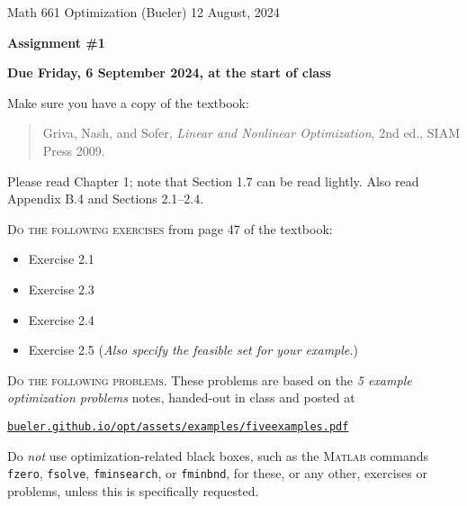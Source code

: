 \documentclass[12pt]{amsart}
\newcommand{\Matlab}{\textsc{Matlab}\xspace}
\begin{document}
\scriptsize \noindent Math 661 Optimization (Bueler) \hfill 12 August, 2024
\normalsize

\medskip\bigskip

\Large\centerline{\textbf{Assignment \#1}}
\large
\bigskip

\centerline{\textbf{Due Friday, 6 September 2024, at the start of class}}
\bigskip
\normalsize

\thispagestyle{empty}

\bigskip
\noindent Make sure you have a copy of the textbook:

\begin{quote}
Griva, Nash, and Sofer, \emph{Linear and Nonlinear Optimization}, 2nd ed., SIAM Press 2009.
\end{quote}

\noindent Please read Chapter 1; note that Section 1.7 can be read lightly.  Also read Appendix B.4 and Sections 2.1--2.4.

\bigskip
\noindent \textsc{Do the following exercises} from page 47 of the textbook:

\begin{itemize}
\item Exercise 2.1
\item Exercise 2.3
\item Exercise 2.4
\item Exercise 2.5 \quad (\emph{Also specify the feasible set for your example.})
\end{itemize}

\bigskip
\noindent \textsc{Do the following problems.}  These problems are based on the \emph{5 example optimization problems} notes, handed-out in class and posted at

\centerline{\href{https://bueler.github.io/opt/assets/examples/fiveexamples.pdf}{\texttt{bueler.github.io/opt/assets/examples/fiveexamples.pdf}}}

\noindent Do \emph{not} use optimization-related black boxes, such as the \Matlab commands \texttt{fzero}, \texttt{fsolve}, \texttt{fminsearch}, or \texttt{fminbnd}, for these, or any other, exercises or problems, unless this is specifically requested.
\end{document}
